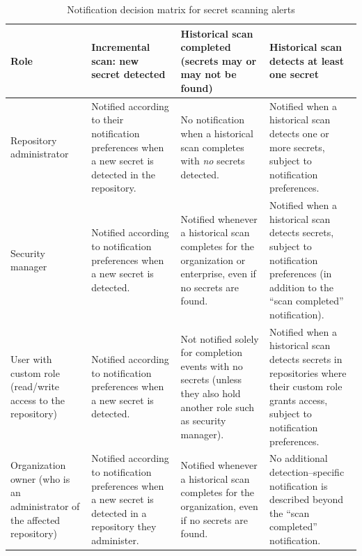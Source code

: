 \documentclass{article}
\begin{document}
\begin{table}[htbp]
  \centering
  \small
  \captionsetup{justification=raggedright,singlelinecheck=false}
  \caption{Notification decision matrix for secret scanning alerts}
  \label{tab:decision-matrix}
  \begin{tabular}{@{}
      >{\raggedright\arraybackslash}p{}
      >{\raggedright\arraybackslash}p{}
      >{\raggedright\arraybackslash}p{}
      >{\raggedright\arraybackslash}p{}
    @{}}
    \toprule
    \textbf{Role} &
    \textbf{Incremental scan: new secret detected} &
    \textbf{Historical scan completed (secrets may or may not be found)} &
    \textbf{Historical scan detects at least one secret} \\
    \midrule
    Repository administrator &
      Notified according to their notification preferences when a new secret is detected in the repository. &
      No notification when a historical scan completes with \emph{no} secrets detected. &
      Notified when a historical scan detects one or more secrets, subject to notification preferences. \\[0.75em]

    Security manager &
      Notified according to notification preferences when a new secret is detected. &
      Notified whenever a historical scan completes for the organization or enterprise, even if no secrets are found. &
      Notified when a historical scan detects secrets, subject to notification preferences (in addition to the ``scan completed'' notification). \\[0.75em]

    User with custom role (read/write access to the repository) &
      Notified according to notification preferences when a new secret is detected. &
      Not notified solely for completion events with no secrets (unless they also hold another role such as security manager). &
      Notified when a historical scan detects secrets in repositories where their custom role grants access, subject to notification preferences. \\[0.75em]

    Organization owner (who is an administrator of the affected repository) &
      Notified according to notification preferences when a new secret is detected in a repository they administer. &
      Notified whenever a historical scan completes for the organization, even if no secrets are found. &
      No additional detection--specific notification is described beyond the ``scan completed'' notification. \\[0.75em]


\end{tabular}
\end{table}
\end{document}
